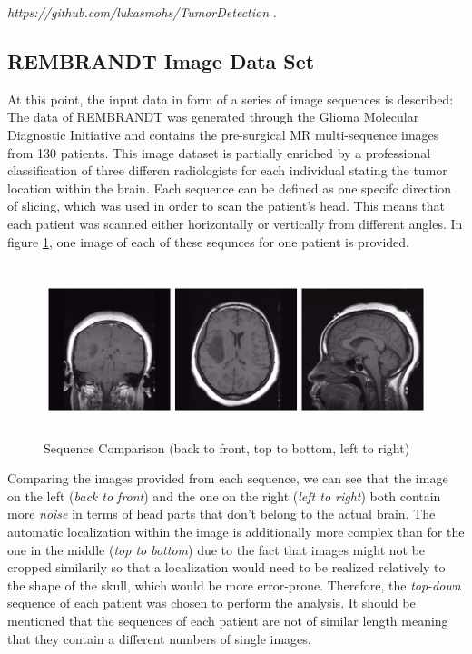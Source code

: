 \documentclass[twoside,11pt]{article}
\begin{document}
\textit{https://github.com/lukasmohs/TumorDetection} .

\subsection{REMBRANDT Image Data Set}
At this point, the input data in form of a series of image sequences is described: 
The data of REMBRANDT was generated through the Glioma Molecular Diagnostic Initiative and contains the pre-surgical MR multi-sequence images from 130 patients. This image dataset is partially enriched by a professional classification of three differen radiologists for each individual stating the tumor location within the brain. Each sequence can be defined as one specifc direction of slicing, which was used in order to scan the patient's head. This means that each patient was scanned either  horizontally or vertically from different angles. In figure \ref{fig:sequences}, one image of each of these sequnces for one patient is provided. \citep{cite3}

\begin{figure}
	\label{fig:sequences}
	\centering
	\includegraphics[height=5cm]{sequences}
	\caption{Sequence Comparison (back to front, top to bottom, left to right)}
\end{figure}%

Comparing the images provided from each sequence, we can see that the image on the left  (\textit{back to front}) and the one on the right (\textit{left to right}) both contain more \textit{noise} in terms of head parts that don't belong to the actual brain. The automatic localization within the image is additionally more complex than for the one in the middle (\textit{top to bottom}) due to the fact that images might not be cropped similarily so that a localization would need to be realized relatively to the shape of the skull, which would be more error-prone.
Therefore, the \textit{top-down} sequence of each patient was chosen to perform the analysis. It should be mentioned that the sequences of each patient are not of similar length meaning that they contain a different numbers of single images.
\end{document}
